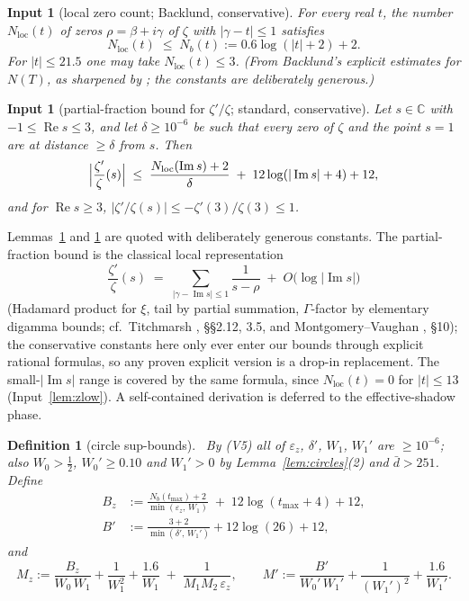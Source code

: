 \documentclass[11pt]{amsart}
\newtheorem{definition}[theorem]{Definition}
\newtheorem{assumption}[theorem]{Input}
\numberwithin{equation}{section}
\newcommand{\C}{\mathbb{C}}
\newcommand{\re}{\operatorname{Re}}
\newcommand{\im}{\operatorname{Im}}
\newcommand{\dbar}{\bar{d}}
\begin{document}
\begin{assumption}[local zero count; Backlund, conservative]\label{lem:backlund}
For every real $t$, the number $N_{\mathrm{loc}}(t)$ of zeros
$\rho = \beta + i\gamma$ of $\zeta$ with $|\gamma - t| \le 1$ satisfies
\[
N_{\mathrm{loc}}(t) \;\le\; N_b(t) := 0.6\log(|t| + 2) + 2.
\]
For $|t| \le 21.5$ one may take $N_{\mathrm{loc}}(t) \le 3$. (From
Backlund's explicit estimates for $N(T)$, as sharpened by
\cite{Tru14, Bac14}; the constants are deliberately generous.)
\end{assumption}

\begin{assumption}[partial-fraction bound for $\zeta'/\zeta$; standard,
conservative]\label{lem:zeta-prime-prime}
Let $s \in \C$ with $-1 \le \re s \le 3$, and let $\delta \ge 10^{-6}$
be such that every zero of $\zeta$ and the point $s=1$ are at distance
$\ge \delta$ from $s$. Then
\[
\Bigl|\frac{\zeta'}{\zeta}(s)\Bigr|
\;\le\; \frac{N_{\mathrm{loc}}(\im s) + 2}{\delta}
\;+\; 12\log(|\im s| + 4) + 12,
\]
and for $\re s \ge 3$,
$\bigl|\zeta'/\zeta(s)\bigr| \le
-\zeta'(3)/\zeta(3) \le 1$.
\end{assumption}

\noindent Lemmas~\ref{lem:backlund} and
\ref{lem:zeta-prime-prime} are quoted with deliberately generous
constants. The partial-fraction bound is the classical local
representation
\[
\frac{\zeta'}{\zeta}(s) \;=\;
\sum_{|\gamma - \im s| \le 1}\frac{1}{s-\rho}
\;+\; O\bigl(\log|\im s|\bigr)
\]
(Hadamard product for $\xi$, tail by partial
summation, $\Gamma$-factor by elementary digamma bounds; cf.\
Titchmarsh \cite{Tit51}, \S\S2.12, 3.5, and Montgomery--Vaughan
\cite{MV07}, \S10); the conservative constants here only ever enter our
bounds through explicit rational formulas, so any proven explicit
version is a drop-in replacement. The small-$|\im s|$ range is covered
by the same formula, since $N_{\mathrm{loc}}(t) = 0$ for $|t| \le 13$
(Input~\ref{lem:zlow}). A self-contained derivation is deferred to the
effective-shadow phase.

\begin{definition}[circle sup-bounds]\label{def:Mz}\
By (V5) all of $\varepsilon_z$, $\delta'$, $W_1$, $W_1'$ are $\ge
10^{-6}$; also $W_0 > \tfrac12$, $W_0' \ge 0.10$ and $W_1' > 0$ by
Lemma~\ref{lem:circles}(2) and $\dbar > 251$. Define
\begin{align*}
B_z &:= \frac{N_b(t_{\max}) + 2}{\min(\varepsilon_z,\, W_1)}
\;+\; 12\log(t_{\max} + 4) + 12,\\
B' &:= \frac{3 + 2}{\min(\delta',\, W_1')} + 12\log(26) + 12,
\end{align*}
and
\[
M_z := \frac{B_z}{W_0\,W_1} + \frac{1}{W_1^2} + \frac{1.6}{W_1}
\;+\; \frac{1}{M_1 M_2\, \varepsilon_z},
\qquad
M' := \frac{B'}{W_0'\,W_1'} + \frac{1}{(W_1')^2} + \frac{1.6}{W_1'} .
\]
\end{definition}
\end{document}
